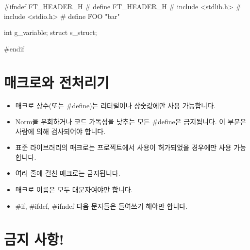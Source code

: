 \documentclass{42-ko}
\begin{document}
        \begin{42ccode}
#ifndef FT_HEADER_H
# define FT_HEADER_H
# include <stdlib.h>
# include <stdio.h>
# define FOO "bar"

int		g_variable;
struct	s_struct;

#endif
        \end{42ccode}
        \newpage

    \section{매크로와 전처리기}

        \begin{itemize}

            \item 매크로 상수(또는 \#define)는 리터럴이나
                상숫값에만 사용 가능합니다.
            \item Norm을 우회하거나 코드 가독성을 낮추는 모든 \#define은 금지됩니다.
                이 부분은 사람에 의해 검사되어야 합니다.
            \item 표준 라이브러리의 매크로는 프로젝트에서
                사용이 허가되었을 경우에만 사용 가능합니다.
            \item 여러 줄에 걸친 매크로는 금지됩니다.
            \item 매크로 이름은 모두 대문자여야만 합니다.
            \item \#if, \#ifdef, \#ifndef 다음 문자들은 들여쓰기 해야만 합니다.

        \end{itemize}
        \newpage


    \section{금지 사항!}
\end{document}
